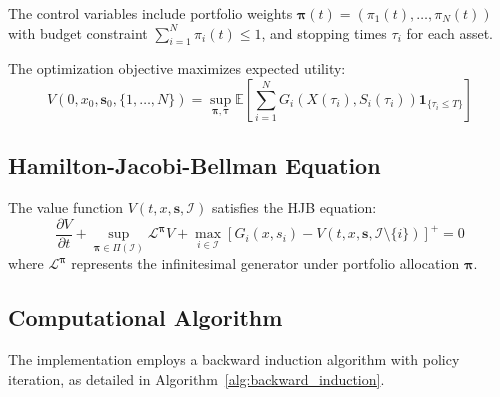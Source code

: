 \documentclass[11pt]{article}
\begin{document}
The control variables include portfolio weights $\boldsymbol{\pi}(t) = (\pi_1(t), \ldots, \pi_N(t))$ with budget constraint $\sum_{i=1}^N \pi_i(t) \leq 1$, and stopping times $\tau_i$ for each asset.

The optimization objective maximizes expected utility:
\begin{equation}
V(0, x_0, \mathbf{s}_0, \{1,\ldots,N\}) = \sup_{\boldsymbol{\pi}, \boldsymbol{\tau}} \mathbb{E}\left[\sum_{i=1}^N G_i(X(\tau_i), S_i(\tau_i)) \mathbf{1}_{\{\tau_i \leq T\}}\right]
\end{equation}

\subsection{Hamilton-Jacobi-Bellman Equation}
The value function $V(t, x, \mathbf{s}, \mathcal{I})$ satisfies the HJB equation:
\begin{equation}
\frac{\partial V}{\partial t} + \sup_{\boldsymbol{\pi} \in \Pi(\mathcal{I})} \mathcal{L}^{\boldsymbol{\pi}} V + \max_{i \in \mathcal{I}} \left[G_i(x, s_i) - V(t, x, \mathbf{s}, \mathcal{I} \setminus \{i\})\right]^+ = 0
\end{equation}
where $\mathcal{L}^{\boldsymbol{\pi}}$ represents the infinitesimal generator under portfolio allocation $\boldsymbol{\pi}$.

\subsection{Computational Algorithm}
The implementation employs a backward induction algorithm with policy iteration, as detailed in Algorithm~\ref{alg:backward_induction}.
\end{document}
